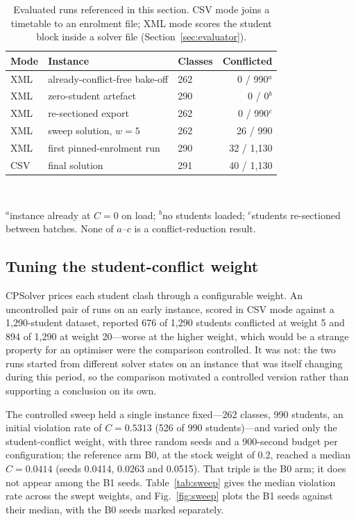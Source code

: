 \documentclass[journal]{IEEEtran}
\begin{document}
\begin{table}[t]
\centering
\caption{Evaluated runs referenced in this section. CSV mode joins a timetable to an enrolment file; XML mode scores the student block inside a solver file (Section~\ref{sec:evaluator}).}
\label{tab:crossrun}
\footnotesize
\begin{tabular}{@{}lllr@{}}
\toprule
Mode & Instance & Classes & Conflicted \\
\midrule
XML & already-conflict-free bake-off & 262 & 0 / 990$^{a}$ \\
XML & zero-student artefact & 290 & 0 / 0$^{b}$ \\
XML & re-sectioned export & 262 & 0 / 990$^{c}$ \\
XML & sweep solution, $w{=}5$ & 262 & 26 / 990 \\
XML & first pinned-enrolment run & 290 & 32 / 1{,}130 \\
CSV & final solution & 291 & 40 / 1{,}130 \\
\bottomrule
\end{tabular}
\\[2pt]
\raggedright\footnotesize $^{a}$instance already at $C=0$ on load; $^{b}$no students loaded; $^{c}$students re-sectioned between batches. None of $a$--$c$ is a conflict-reduction result.
\end{table}

\subsection{Tuning the student-conflict weight}
\label{sec:weight-sweep}
CPSolver prices each student clash through a configurable weight. An uncontrolled pair of runs on an early instance, scored in CSV mode against a 1{,}290-student dataset, reported 676 of 1{,}290 students conflicted at weight 5 and 894 of 1{,}290 at weight 20---worse at the higher weight, which would be a strange property for an optimiser were the comparison controlled. It was not: the two runs started from different solver states on an instance that was itself changing during this period, so the comparison motivated a controlled version rather than supporting a conclusion on its own.

The controlled sweep held a single instance fixed---262 classes, 990 students, an initial violation rate of $C=0.5313$ (526 of 990 students)---and varied only the student-conflict weight, with three random seeds and a 900-second budget per configuration; the reference arm B0, at the stock weight of 0.2, reached a median $C=0.0414$ (seeds 0.0414, 0.0263 and 0.0515). That triple is the B0 arm; it does not appear among the B1 seeds. Table~\ref{tab:sweep} gives the median violation rate across the swept weights, and Fig.~\ref{fig:sweep} plots the B1 seeds against their median, with the B0 seeds marked separately.
\end{document}
